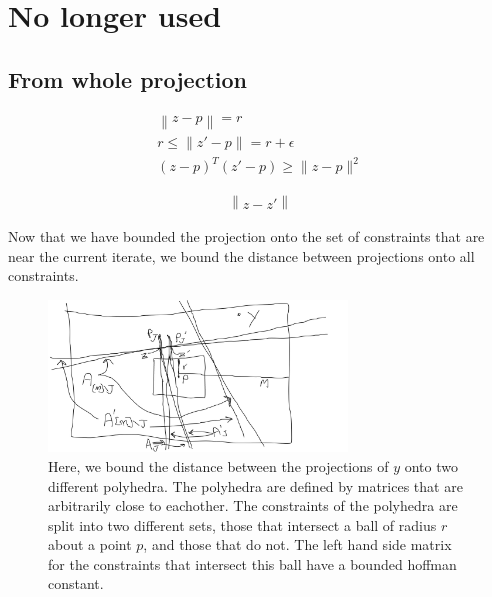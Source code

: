 \documentclass{article}
\theoremstyle{case}
\numberwithin{theorem}{subsection}
\newcommand{\activeindicesk}{{ \mathbb I_h^{(k)} }}
\newcommand{\minactivealpha}{{ \alpha_{\textrm{h}} }}
\newcommand{\activedirk}{{ u_{h}^{(k)} }}
\newcommand{\activegradmin}{{ g_{\textrm{h}} }}
\begin{document}
\section{No longer used}


\subsection{From whole projection}


\begin{align*}
\left\|z - p\right\| = r \\
r \le \left\|z' - p\right\| = r + \epsilon \\
(z - p)^T (z' - p) \ge \|z - p\|^2
\end{align*}

\begin{align*}
\left\|z - z'\right\|
\end{align*}



Now that we have bounded the projection onto the set of constraints that are near the current iterate, we bound the distance between projections onto all constraints.


\newpage
\begin{figure}[ht]
    \centering
    \includegraphics[width=300px]{images/complicated_lemma.png}
    \caption{
    	Here, we bound the distance between the projections of $y$ onto two different polyhedra.
    	The polyhedra are defined by matrices that are arbitrarily close to eachother.
    	The constraints of the polyhedra are split into two different sets, those that intersect a ball of radius $r$ about a point $p$,
    	and those that do not.
    	The left hand side matrix for the constraints that intersect this ball have a bounded hoffman constant.
	}
    \label{complicated_lemma}
\end{figure}
\newpage
\end{document}
